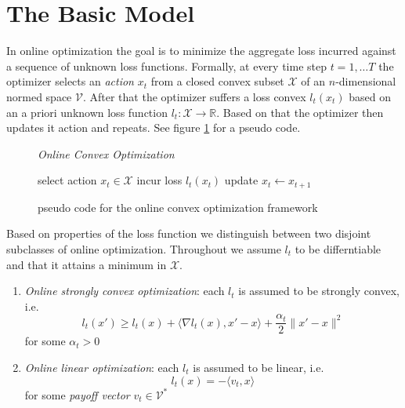 \section{The Basic Model}\label{section:theBasicModel}

In online optimization the goal is to minimize the aggregate loss incurred against a sequence of unknown loss functions. Formally, at every time step $t = 1, \dots T$ the optimizer selects an \textit{action} $x_t$ from a closed convex subset $\mathcal{X}$ of an $n$-dimensional normed space $\mathcal{V}$. After that the optimizer suffers a loss convex $l_t(x_t)$ based on an a priori unknown loss function $l_t:\mathcal{X} \to \mathbb{R}$. Based on that the optimizer then updates it action and repeats. See figure \ref{fig:OCO} for a pseudo code.\\

\begin{figure}[H]\centering
    \textit{Online Convex Optimization}
    \begin{minipage}{.9\linewidth}
        \begin{algorithm}[H]
        \DontPrintSemicolon
         {
        select action $x_t \in \mathcal{X}$ \;
        incur loss $l_t(x_t)$ \;
        update $x_t \gets x_{t+1}$ \;
        }
        \end{algorithm}\caption{pseudo code for the online convex optimization framework}  \label{fig:OCO}
  \end{minipage}
\end{figure}

Based on properties of the loss function we distinguish between two disjoint subclasses of online optimization. Throughout we assume $l_t$ to be differntiable and that it attains a minimum in $\mathcal{X}$.

\begin{enumerate}
    \item\label{item:stronglyOptimization} \textit{Online strongly convex optimization}: each $l_t$ is assumed to be strongly convex, i.e.
    \begin{equation}\label{equ:stronglyOptimization}
        l_t(x') \ge l_t(x) + \langle \nabla l_t(x),x'-x\rangle + \frac{\alpha_t}{2}\|x'-x\|^2
    \end{equation}
    for some $\alpha_t > 0$
    \item \textit{Online linear optimization}: each $l_t$ is assumed to be linear, i.e. 
    \begin{equation}\label{equ:linaerOptimization}
        l_t(x) = -\langle v_t,x\rangle
    \end{equation}
    for some \textit{payoff vector} $v_t \in \mathcal{V}^*$
\end{enumerate}


